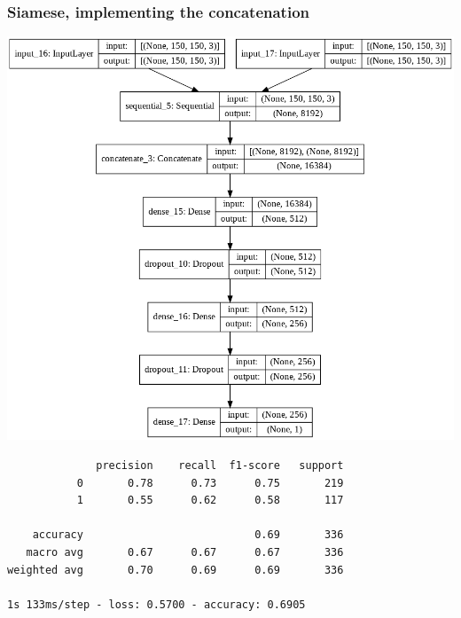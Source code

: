 \documentclass{article}
\begin{document}
\subsubsection{Siamese, implementing the concatenation}
\begin{minipage}{0.45\textwidth}
        \includegraphics[scale=0.32]{./img/siamese_concat.png}
\end{minipage}

\begin{verbatim}
              precision    recall  f1-score   support
           0       0.78      0.73      0.75       219
           1       0.55      0.62      0.58       117

    accuracy                           0.69       336
   macro avg       0.67      0.67      0.67       336
weighted avg       0.70      0.69      0.69       336

1s 133ms/step - loss: 0.5700 - accuracy: 0.6905
\end{verbatim}
\end{document}
